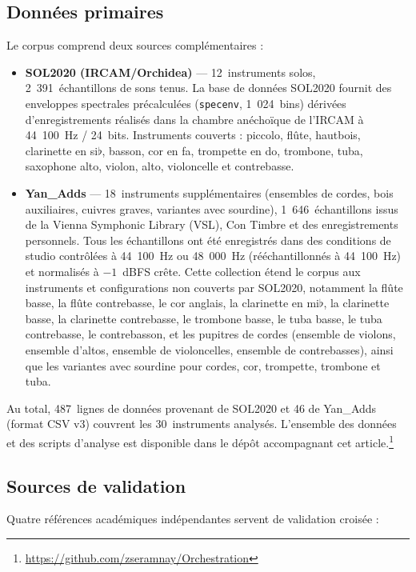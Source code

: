 \documentclass[12pt,a4paper]{article}
\begin{document}
\subsection{Données primaires}

Le corpus comprend deux sources complémentaires :

\begin{itemize}
\item \textbf{SOL2020 (IRCAM/Orchidea)} --- 12~instruments solos, 2~391~échantillons
de sons tenus. La base de données SOL2020 fournit des enveloppes spectrales précalculées
(\texttt{specenv}, 1~024~bins) dérivées d'enregistrements réalisés dans la chambre
anéchoïque de l'IRCAM à 44~100~Hz / 24~bits. Instruments couverts : piccolo, flûte,
hautbois, clarinette en si$\flat$, basson, cor en fa, trompette en do, trombone, tuba,
saxophone alto, violon, alto, violoncelle et contrebasse.

\item \textbf{Yan\_Adds} --- 18~instruments supplémentaires (ensembles de cordes,
bois auxiliaires, cuivres graves, variantes avec sourdine), 1~646~échantillons issus
de la Vienna Symphonic Library (VSL), Con Timbre et des enregistrements personnels.
Tous les échantillons ont été enregistrés dans des conditions de studio contrôlées à
44~100~Hz ou 48~000~Hz (rééchantillonnés à 44~100~Hz) et normalisés à $-1$~dBFS
crête. Cette collection étend le corpus aux instruments et configurations non couverts
par SOL2020, notamment la flûte basse, la flûte contrebasse, le cor anglais, la
clarinette en mi$\flat$, la clarinette basse, la clarinette contrebasse, le trombone
basse, le tuba basse, le tuba contrebasse, le contrebasson, et les pupitres de cordes
(ensemble de violons, ensemble d'altos, ensemble de violoncelles, ensemble de
contrebasses), ainsi que les variantes avec sourdine pour cordes, cor, trompette,
trombone et tuba.
\end{itemize}

Au total, 487~lignes de données provenant de SOL2020 et 46 de Yan\_Adds (format CSV
v3) couvrent les 30~instruments analysés. L'ensemble des données et des scripts
d'analyse est disponible dans le dépôt accompagnant cet
article.\footnote{\url{https://github.com/zseramnay/Orchestration}}

\subsection{Sources de validation}

Quatre références académiques indépendantes servent de validation croisée :
\end{document}

